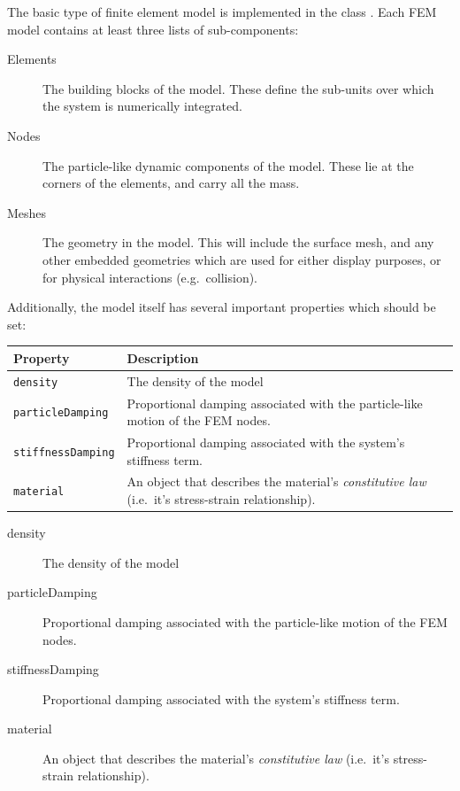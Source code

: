 The basic type of finite element model is implemented in the class 
.  Each FEM model contains
at least three lists of sub-components:

\begin{description}
\item[Elements]\mbox{}

The building blocks of the model.  These define the sub-units over which
the system is numerically integrated.

\item[Nodes]\mbox{}

The particle-like dynamic components of the model.  These lie at the corners
of the elements, and carry all the mass.

\item[Meshes]\mbox{}

The geometry in the model.  This will include the surface mesh, and any other
embedded geometries which are used for either display purposes, or for physical
interactions (e.g.~collision).
\end{description}

Additionally, the model itself has several important properties which should be
set:
\begin{center}
	\begin{tabular}{|ll|}
		\hline
		Property & Description\\
		\hline
		{\tt density} & The density of the model\\
		{\tt particleDamping} & Proportional damping associated with the 
		    particle-like motion of the FEM nodes.\\
		{\tt stiffnessDamping} & Proportional damping associated with the 
		    system's stiffness term.\\
		{\tt material} & An object that describes the material's 
		    \emph{constitutive law} (i.e.~it's 
stress-strain relationship).\\
		\hline
	\end{tabular}
\end{center}

\begin{description}
\item[density] \mbox{}

The density of the model

\item[particleDamping] \mbox{}

Proportional damping associated with the particle-like motion of the FEM nodes.

\item[stiffnessDamping]\mbox{}

Proportional damping associated with the system's stiffness term.

\item[material]\mbox{}

An object that describes the material's \emph{constitutive law} (i.e.~it's 
stress-strain relationship).
\end{description}


